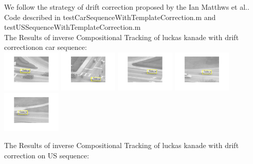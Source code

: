 \documentclass[12pt]{article}
\newenvironment{problem}[2][Problem]{\begin{trivlist}
\item[\hskip \labelsep {\bfseries #1}\hskip \labelsep {\bfseries #2.}]}{\end{trivlist}}
\begin{document}
\begin{problem}{1.3}
\end{problem}
\begin{problem}{1.4}
We follow the strategy of drift correction proposed by the Ian Matthws et al..
Code described in testCarSequenceWithTemplateCorrection.m and  testUSSequenceWithTemplateCorrection.m\\

The Results of inverse Compositional Tracking of luckas kanade with drift correctionon car sequence:\\
  \includegraphics[width=0.21\textwidth]{results/2_car_tempcorr}
  \includegraphics[width=0.21\textwidth]{results/100_car_tempcorr}
  \includegraphics[width=0.21\textwidth]{results/200_car_tempcorr}
  \includegraphics[width=0.21\textwidth]{results/300_car_tempcorr}  
  \includegraphics[width=0.21\textwidth]{results/400_car_tempcorr}  
  
The Results of inverse Compositional Tracking of luckas kanade with drift correction on US sequence:\\


\end{problem}
\end{document}
